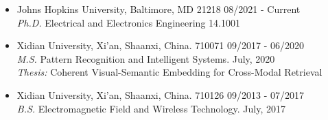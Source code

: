 \documentclass[margin,line,pifont,palatino,courier]{res}
\newenvironment{list1}{
  \begin{list}{\ding{113}}{%
      \setlength{\itemsep}{0in}
      \setlength{\parsep}{0in} \setlength{\parskip}{0in}
      \setlength{\topsep}{0in} \setlength{\partopsep}{0in}
      \setlength{\leftmargin}{0.17in}}}{\end{list}}
\newenvironment{list2}{
  \begin{list}{$\bullet$}{%
      \setlength{\itemsep}{0in}
      \setlength{\parsep}{0in} \setlength{\parskip}{0in}
      \setlength{\topsep}{0in} \setlength{\partopsep}{0in}
      \setlength{\leftmargin}{0.2in}}}{\end{list}}
\begin{document}
\begin{resume}
\begin{itemize}[leftmargin=*]
\item Johns Hopkins University, Baltimore, MD 21218 \hfill 08/2021 - Current\\
	\textit{Ph.D.} Electrical and Electronics Engineering 14.1001
\item Xidian University, Xi'an, Shaanxi, China. 710071 \hfill 09/2017 - 06/2020\\
	\textit{M.S.} Pattern Recognition and Intelligent Systems. July, 2020\\
	\textit{Thesis:} Coherent Visual-Semantic Embedding for Cross-Modal Retrieval
\item Xidian University, Xi'an, Shaanxi, China. 710126 \hfill 09/2013 - 07/2017\\
	\textit{B.S.} Electromagnetic Field and Wireless Technology. July, 2017
\end{itemize}

%
%
%

%


\end{resume}
\end{document}
